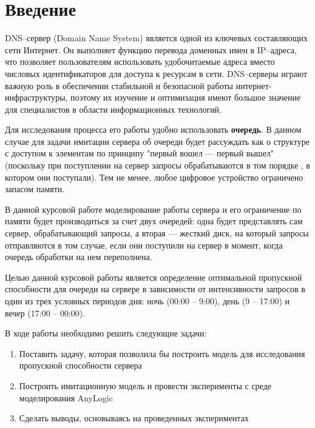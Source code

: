

\def\oldbibitem{}
\let\oldbibitem=\bibitem
\def\bibitem{\stepcounter{citenum}\oldbibitem}




\tableofcontents
\newpage
\section{Введение}
DNS--сервер (Domain Name System) является одной из ключевых составляющих сети Интернет. Он выполняет функцию перевода доменных имен в IP--адреса,
что позволяет пользователям использовать удобочитаемые адреса вместо числовых идентификаторов для доступа к ресурсам в сети. DNS--серверы играют
важную роль в обеспечении стабильной и безопасной работы интернет-инфраструктуры, поэтому их изучение и оптимизация имеют большое значение для
специалистов в области информационных технологий.

Для исследования процесса его работы удобно использовать \textbf{очередь}. В данном случае для задачи имитации сервера об очереди будет рассуждать как
о структуре с доступом к элементам по принципу "первый вошел --- первый вышел" (поскольку при поступлении на сервер запросы обрабатываются в том порядке
, в котором они поступали). Тем не менее, любое цифровое устройство ограничено запасом памяти.

В данной курсовой работе моделирование работы сервера и его ограничение по памяти будет производиться за счет двух очередей: одна будет
представлять сам сервер, обрабатывающий запросы, а вторая --- жесткий диск, на который запросы отправляются в том случае, если они поступили на сервер в момент,
когда очередь обработки на нем переполнена.

Целью данной курсовой работы является определение оптимальной пропускной способности для очереди на сервере в зависимости от интенсивности запросов в
один из трех условных периодов дня: ночь (00:00 -- 9:00), день (9 -- 17:00) и вечер (17:00 -- 00:00).

В ходе работы необходимо решить следующие задачи:
\begin{enumerate}
    \item Поставить задачу, которая позволила бы построить модель для исследования пропускной способности сервера
    \item Построить имитационную модель и провести эксперименты с среде моделирования AnyLogic
    \item Сделать выводы, основываясь на проведенных экспериментах
\end{enumerate}

